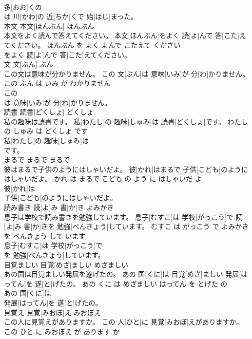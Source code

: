 \documentclass[8pt]{extreport}
\begin{document}
\begin{CJK}{UTF8}{min}
\\	多[おお]くの
\\	は 川[かわ]の 近[ちか]くで 始[はじ]まった。			
\\	本文	本文[ほんぶん]	ほんぶん	
\\	本文をよく読んで答えてください。	本文[ほんぶん]をよく 読[よ]んで 答[こた]えてください。	ほんぶん を よく よんで こたえて ください	
\\	をよく 読[よ]んで 答[こた]えてください。			
\\	文	文[ぶん]	ぶん	
\\	この文は意味が分かりません。	この 文[ぶん]は 意味[いみ]が 分[わ]かりません。	この ぶん は いみ が わかりません	
\\	この
\\	は 意味[いみ]が 分[わ]かりません。			
\\	読書	読書[どくしょ]	どくしょ	
\\	私の趣味は読書です。	私[わたし]の 趣味[しゅみ]は 読書[どくしょ]です。	わたし の しゅみ は どくしょ です	
\\	私[わたし]の 趣味[しゅみ]は
\\	です。			
\\	まるで	まるで	まるで	
\\	彼はまるで子供のようにはしゃいだよ。	彼[かれ]はまるで 子供[こども]のようにはしゃいだよ。	かれ は まるで こども の よう に はしゃいだ よ	
\\	彼[かれ]は
\\	子供[こども]のようにはしゃいだよ。			
\\	読み書き	読[よ]み 書[か]き	よみかき	
\\	息子は学校で読み書きを勉強しています。	息子[むすこ]は 学校[がっこう]で 読[よ]み 書[か]きを 勉強[べんきょう]しています。	むすこ は がっこう で よみかき を べんきょう して います	
\\	息子[むすこ]は 学校[がっこう]で
\\	を 勉強[べんきょう]しています。			
\\	目覚ましい	目覚[めざ]ましい	めざましい	
\\	あの国は目覚ましい発展を遂げたの。	あの 国[くに]は 目覚[めざ]ましい 発展[はってん]を 遂[と]げたの。	あの くに は めざましい はってん を とげた の	
\\	あの 国[くに]は
\\	発展[はってん]を 遂[と]げたの。			
\\	見覚え	見覚[みおぼ]え	みおぼえ	
\\	この人に見覚えがありますか。	この 人[ひと]に 見覚[みおぼ]えがありますか。	この ひと に みおぼえ が あります か	

\end{CJK}
\end{document}
